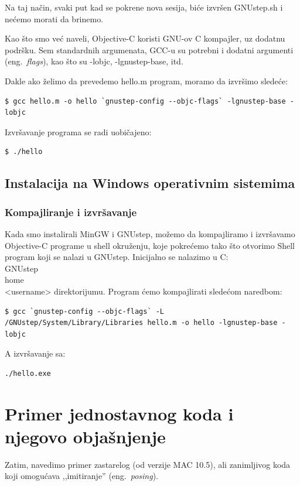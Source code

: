 \documentclass[a4paper]{article}
\begin{document}
{{Na taj način, svaki put kad se pokrene nova sesija, biće izvršen GNUstep.sh i nećemo morati da brinemo.

Kao što smo već naveli, Objective-C koristi GNU-ov C kompajler, uz dodatnu
podršku.
Sem standardnih argumenata, GCC-u su potrebni i dodatni argumenti (eng.~{\em flags}), kao što su -lobjc, -lgnustep-base, itd.

Dakle ako želimo da prevedemo hello.m program, moramo da izvršimo sledeće:
\begin{lstlisting}[frame=single]
$ gcc hello.m -o hello `gnustep-config --objc-flags` -lgnustep-base -lobjc
\end{lstlisting}

Izvršavanje programa se radi uobičajeno:
\begin{lstlisting}[frame=single]
$ ./hello
\end{lstlisting}

\subsection{Instalacija na Windows operativnim sistemima}
\subsubsection{Kompajliranje i izvršavanje}
Kada smo instalirali MinGW i GNUstep, možemo da kompajliramo i izvršavamo Objective-C programe u shell okruženju, koje pokrećemo tako što otvorimo Shell program koji se nalazi u GNUstep.
Inicijalno se nalazimo u C:\\GNUstep\\home\\<username> direktorijumu.
Program ćemo kompajlirati sledećom naredbom:
\begin{lstlisting}[frame=single]
$ gcc `gnustep-config --objc-flags` -L /GNUstep/System/Library/Libraries hello.m -o hello -lgnustep-base -lobjc
\end{lstlisting}

A izvršavanje sa:
\begin{lstlisting}[frame=single]
./hello.exe
\end{lstlisting}

\section{Primer jednostavnog koda i njegovo objašnjenje}
\label{sec:primer}

Zatim, navedimo primer zastarelog (od verzije MAC 10.5), ali zanimljivog koda koji omogućava ,,imitiranje'' (eng.~{\em posing}). 

}}
\end{document}

